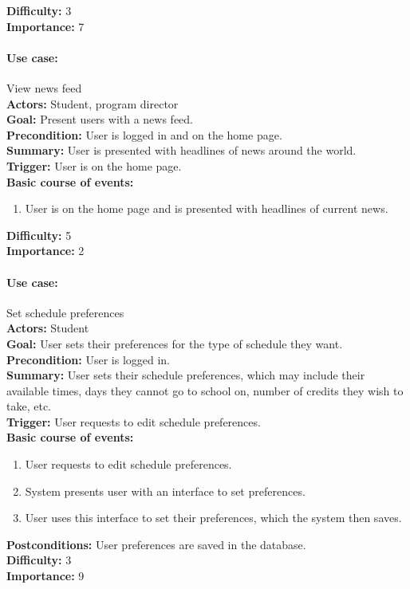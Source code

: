 \documentclass[12pt]{article}
\begin{document}
\textbf{Difficulty:} 3\\
\textbf{Importance:} 7\\


\paragraph*{Use case:} View news feed\\
\textbf{Actors:} Student, program director\\
\textbf{Goal:} Present users with a news feed.\\
\textbf{Precondition:} User is logged in and on the home page.\\
\textbf{Summary:} User is presented with headlines of news around the world.\\
\textbf{Trigger:} User is on the home page.\\
\textbf{Basic course of events:}
\begin{enumerate}
\item User is on the home page and is presented with headlines of current news.
\end{enumerate}
\textbf{Difficulty:} 5\\
\textbf{Importance:} 2\\


\paragraph*{Use case:} Set schedule preferences\\
\textbf{Actors:} Student\\
\textbf{Goal:} User sets their preferences for the type of schedule they want.\\
\textbf{Precondition:} User is logged in.\\
\textbf{Summary:} User sets their schedule preferences, which may include their available times, days they cannot go to school on, number of credits they wish to take, etc.\\
\textbf{Trigger:} User requests to edit schedule preferences.\\
\textbf{Basic course of events:}
\begin{enumerate}
\item User requests to edit schedule preferences.
\item System presents user with an interface to set preferences.
\item User uses this interface to set their preferences, which the system then saves.
\end{enumerate}
\textbf{Postconditions:} User preferences are saved in the database.\\
\textbf{Difficulty:} 3\\
\textbf{Importance:} 9\\
\end{document}
